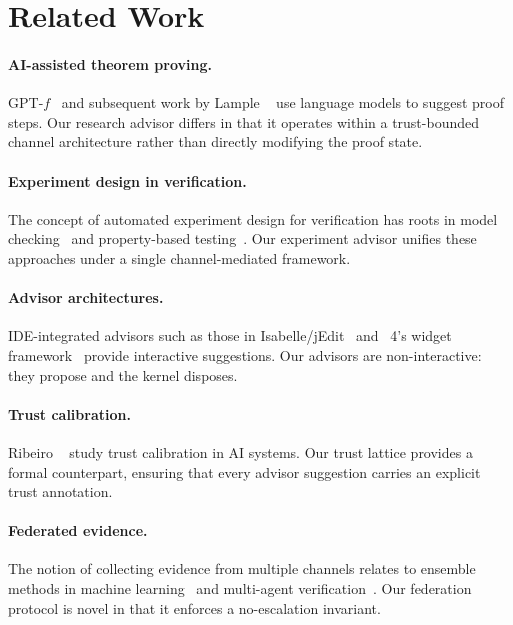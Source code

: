 \documentclass[11pt]{article}
\begin{document}
\section{Related Work}\label{sec:related}

\paragraph{AI-assisted theorem proving.}
GPT-$f$~\cite{polu2020gptf} and subsequent work by
Lample \etal{}~\cite{lample2022hypertree} use language
models to suggest proof steps.  Our research advisor
differs in that it operates within a trust-bounded
channel architecture rather than directly modifying
the proof state.

\paragraph{Experiment design in verification.}
The concept of automated experiment design for
verification has roots in model checking~\cite{clarke1999mc}
and property-based testing~\cite{claessen2000quickcheck}.
Our experiment advisor unifies these approaches under
a single channel-mediated framework.

\paragraph{Advisor architectures.}
IDE-integrated advisors such as those in
Isabelle/jEdit~\cite{wenzel2014isabelle} and
\LEAN{}~4's widget framework~\cite{moura2021lean4}
provide interactive suggestions.  Our advisors are
non-interactive: they propose and the kernel disposes.

\paragraph{Trust calibration.}
Ribeiro \etal{}~\cite{ribeiro2020trust} study trust
calibration in AI systems.  Our trust lattice provides
a formal counterpart, ensuring that every advisor
suggestion carries an explicit trust annotation.

\paragraph{Federated evidence.}
The notion of collecting evidence from multiple
channels relates to ensemble methods in machine
learning~\cite{dietterich2000ensemble} and
multi-agent verification~\cite{fisher2013multiagent}.
Our federation protocol is novel in that it enforces
a no-escalation invariant.
\end{document}
